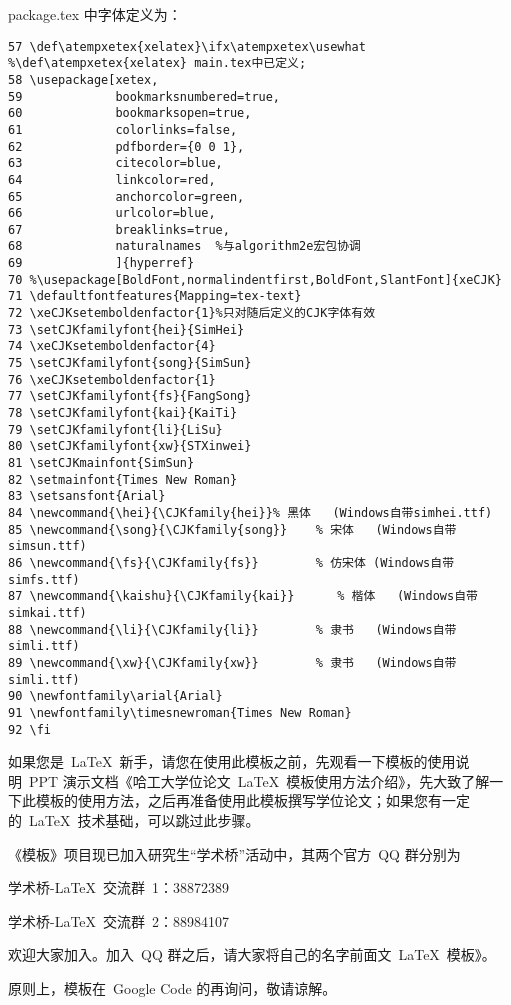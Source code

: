 package.tex 中字体定义为：
\begin{lstlisting}
57 \def\atempxetex{xelatex}\ifx\atempxetex\usewhat %\def\atempxetex{xelatex} main.tex中已定义;
58 \usepackage[xetex,
59             bookmarksnumbered=true,
60             bookmarksopen=true,
61             colorlinks=false,
62             pdfborder={0 0 1},
63             citecolor=blue,
64             linkcolor=red,
65             anchorcolor=green,
66             urlcolor=blue,
67             breaklinks=true,
68             naturalnames  %与algorithm2e宏包协调
69             ]{hyperref}
70 %\usepackage[BoldFont,normalindentfirst,BoldFont,SlantFont]{xeCJK}
71 \defaultfontfeatures{Mapping=tex-text}
72 \xeCJKsetemboldenfactor{1}%只对随后定义的CJK字体有效
73 \setCJKfamilyfont{hei}{SimHei}
74 \xeCJKsetemboldenfactor{4}
75 \setCJKfamilyfont{song}{SimSun}
76 \xeCJKsetemboldenfactor{1}
77 \setCJKfamilyfont{fs}{FangSong}
78 \setCJKfamilyfont{kai}{KaiTi}
79 \setCJKfamilyfont{li}{LiSu}
80 \setCJKfamilyfont{xw}{STXinwei}
81 \setCJKmainfont{SimSun}
82 \setmainfont{Times New Roman}
83 \setsansfont{Arial}
84 \newcommand{\hei}{\CJKfamily{hei}}% 黑体   (Windows自带simhei.ttf)
85 \newcommand{\song}{\CJKfamily{song}}    % 宋体   (Windows自带simsun.ttf)
86 \newcommand{\fs}{\CJKfamily{fs}}        % 仿宋体 (Windows自带simfs.ttf)
87 \newcommand{\kaishu}{\CJKfamily{kai}}      % 楷体   (Windows自带simkai.ttf)
88 \newcommand{\li}{\CJKfamily{li}}        % 隶书   (Windows自带simli.ttf)
89 \newcommand{\xw}{\CJKfamily{xw}}        % 隶书   (Windows自带simli.ttf)
90 \newfontfamily\arial{Arial}                                                                                                                                               
91 \newfontfamily\timesnewroman{Times New Roman}
92 \fi
\end{lstlisting}




如果您是~\LaTeX~新手，请您在使用此模板之前，先观看一下模板的使用说明~PPT 演示文档《哈工大学位论文~\LaTeX~模板使用方法介绍》，先大致了解一下此模板的使用方法，之后再准备使用此模板撰写学位论文；如果您有一定的~\LaTeX~技术基础，可以跳过此步骤。

《模板》项目现已加入研究生“学术桥”活动中，其两个官方~QQ 群分别为

\centerline{学术桥-\LaTeX~交流群~1：38872389}
\centerline{学术桥-\LaTeX~交流群~2：88984107}
\noindent 欢迎大家加入。加入~QQ 群之后，请大家将自己的名字前面文~\LaTeX~模板》。

原则上，模板在~Google Code 的再询问，敬请谅解。
